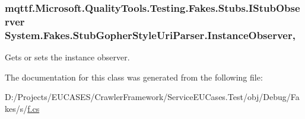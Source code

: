 \hypertarget{class_system_1_1_fakes_1_1_stub_gopher_style_uri_parser_abdb798fd113a85b07a068b29bab26b73}{
\subsubsection[{Instance\-Observer}]{\setlength{\rightskip}{0pt plus 5cm}mqttf.\-Microsoft.\-Quality\-Tools.\-Testing.\-Fakes.\-Stubs.\-I\-Stub\-Observer System.\-Fakes.\-Stub\-Gopher\-Style\-Uri\-Parser.\-Instance\-Observer\hspace{0.3cm}{\ttfamily [get]}, {\ttfamily [set]}}}\label{class_system_1_1_fakes_1_1_stub_gopher_style_uri_parser_abdb798fd113a85b07a068b29bab26b73}


Gets or sets the instance observer.



The documentation for this class was generated from the following file\-:\begin{DoxyCompactItemize}
\item 
D\-:/\-Projects/\-E\-U\-C\-A\-S\-E\-S/\-Crawler\-Framework/\-Service\-E\-U\-Cases.\-Test/obj/\-Debug/\-Fakes/s/\hyperlink{s_2f_8cs}{f.\-cs}\end{DoxyCompactItemize}
